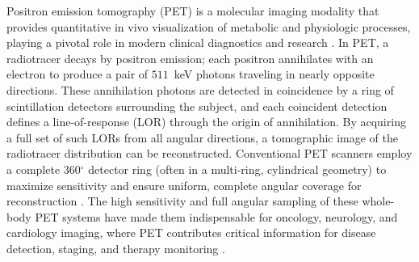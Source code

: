 \documentclass[
reprint,
superscriptaddress,
nofootinbib,
amsmath,amssymb,
aps,
prd,
]{revtex4-2}
\begin{document}
Positron emission tomography (PET) is a molecular imaging modality that provides quantitative in vivo visualization of metabolic and physiologic processes, playing a pivotal role in modern clinical diagnostics and research \cite{townsend2004}. In PET, a radiotracer decays by positron emission; each positron annihilates with an electron to produce a pair of $511$~keV photons traveling in nearly opposite directions. These annihilation photons are detected in coincidence by a ring of scintillation detectors surrounding the subject, and each coincident detection defines a line-of-response (LOR) through the origin of annihilation. By acquiring a full set of such LORs from all angular directions, a tomographic image of the radiotracer distribution can be reconstructed. Conventional PET scanners employ a complete 360$^\circ$ detector ring (often in a multi-ring, cylindrical geometry) to maximize sensitivity and ensure uniform, complete angular coverage for reconstruction \cite{townsend2004}. The high sensitivity and full angular sampling of these whole-body PET systems have made them indispensable for oncology, neurology, and cardiology imaging, where PET contributes critical information for disease detection, staging, and therapy monitoring \cite{townsend2004}.
\end{document}
